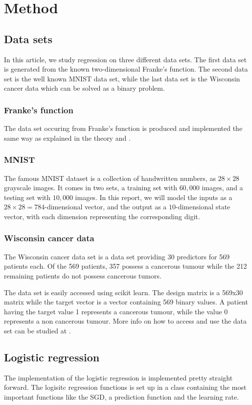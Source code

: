 \documentclass[../main.tex]{subfiles}
\begin{document}
\section{Method}
\subsection{Data sets}
In this article, we study regression on three different data sets. The first data set is generated from the known two-dimensional Franke's function. The second data set is the well known MNIST data set, while the last data set is the Wisconsin cancer data which can be solved as a binary problem.

\subsubsection{Franke's function}
The data set occuring from Franke's function is produced and implemented the same way as explained in the theory and \cite{project2}.

\subsubsection{MNIST}
The famous MNIST dataset is a collection of handwritten numbers, as $28\times 28$ grayscale images. It comes in two sets, a training set with $60,000$ images, and a testing set with $10,000$ images. In this report, we will model the inputs as a $28\times 28 = 784$-dimensional vector, and the output as a $10$-dimensional state vector, with each dimension representing the corresponding digit.

\subsubsection{Wisconsin cancer data}
The Wisconsin cancer data set is a data set providing 30 predictors for 569 patients each. Of the 569 patients, 357 possess a cancerous tumour while the 212 remaining patients do not possess cancerous tumors.

The data set is easily accessed using scikit learn. The design matrix is a 569x30 matrix while the target vector is a vector containing 569 binary values. A patient having the target value 1 represents a cancerous tumour, while the value 0 represents a non cancerous tumour. More info on how to access and use the data set can be studied at \cite{scikit-learn}.

\subsection{Logistic regression}
The implementation of the logistic regression is implemented pretty straight forward. The logisitc regression functions is set up in a class containing the most important functions like the SGD, a prediction function and the learning rate.
\end{document}
